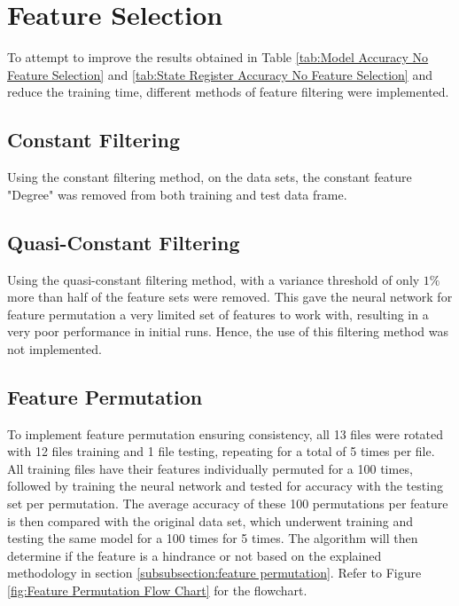 \documentclass{tum-book}
\begin{document}
    \newpage\section{Feature Selection}\label{section:feature selection result}
        To attempt to improve the results obtained in Table \ref{tab:Model Accuracy No Feature Selection} and \ref{tab:State Register Accuracy No Feature Selection} and reduce the training time, different methods of feature filtering were implemented.
    
        \subsection{Constant Filtering}
        Using the constant filtering method, on the data sets, the constant feature "Degree" was removed from both training and test data frame.
        
        \subsection{Quasi-Constant Filtering}
        Using the quasi-constant filtering method, with a variance threshold of only $1\%$ more than half of the feature sets were removed. This gave the neural network for feature permutation a very limited set of features to work with, resulting in a very poor performance in initial runs. Hence, the use of this filtering method was not implemented.
        
        \subsection{Feature Permutation}\label{section:feature permutation results}
        To implement feature permutation ensuring consistency, all 13 files were rotated with 12 files training and 1 file testing, repeating for a total of 5 times per file. All training files have their features individually permuted for a 100 times, followed by training the neural network and tested for accuracy with the testing set per permutation. The average accuracy of these 100 permutations per feature is then compared with the original data set, which underwent training and testing the same model for a 100 times for 5 times. The algorithm will then determine if the feature is a hindrance or not based on the explained methodology in section \ref{subsubsection:feature permutation}. Refer to Figure \ref{fig:Feature Permutation Flow Chart} for the flowchart.  
        
\end{document}
